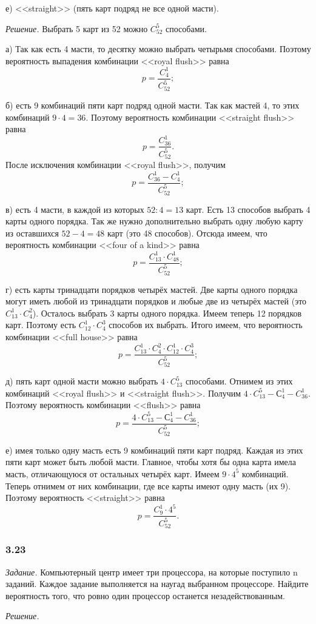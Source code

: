 \documentclass{book}
\begin{document}
е) <<straight>> (пять карт подряд не все одной масти).

\textit{Решение.} Выбрать 5 карт из 52 можно $C_{52}^5$ способами.

а) Так как есть 4 масти, то десятку можно выбрать четырьмя способами. Поэтому вероятность выпадения комбинации <<royal flush>> равна $$p=\frac{C_4^1}{C_{52}^5};$$

б) есть 9 комбинаций пяти карт подряд одной масти. Так как мастей 4, то этих комбинаций $9\cdot 4=36$. Поэтому вероятность комбинации <<straight flush>> равна $$p=\frac{C_{36}^1}{C_{52}^5}.$$ После исключения комбинации <<royal flush>>, получим $$p=\frac{C_{36}^1-C_4^1}{C_{52}^5};$$

в) есть 4 масти, в каждой из которых $52:4=13$ карт. Есть 13 способов выбрать 4 карты одного порядка. Так же нужно дополнительно выбрать одну любую карту из оставшихся $52-4=48$ карт (это 48 способов). Отсюда имеем, что вероятность комбинации <<four of a kind>> равна $$p=\frac{C_{13}^1\cdot C_{48}^1}{C_{52}^5};$$

г) есть карты тринадцати порядков четырёх мастей. Две карты одного порядка могут иметь любой из тринадцати порядков и любые две из четырёх мастей (это $C_{13}^1\cdot C_4^2$). Осталось выбрать 3 карты одного порядка. Имеем теперь 12 порядков карт. Поэтому есть $C_{12}^1\cdot C_4^3$ способов их выбрать. Итого имеем, что вероятность комбинации <<full house>> равна $$p=\frac{C_{13}^1\cdot C_4^2\cdot C_{12}^1\cdot C_4^3}{C_{52}^5};$$

д) пять карт одной масти можно выбрать $4\cdot C_{13}^5$ способами. Отнимем из этих комбинаций <<royal flush>> и <<straight flush>>. Получим $4\cdot C_{13}^5-С_4^1-C_{36}^1$. Поэтому вероятность комбинации <<flush>> равна $$p=\frac{4\cdot C_{13}^5-С_4^1-C_{36}^1}{C_{52}^5};$$

е) имея только одну масть есть 9 комбинаций пяти карт подряд. Каждая из этих пяти карт может быть любой масти. Главное, чтобы хотя бы одна карта имела масть, отличающуюся от остальных четырёх карт. Имеем $9\cdot 4^5$ комбинаций. Теперь отнимем от них комбинации, где все карты имеют одну масть (их 9). Поэтому вероятность <<straight>> равна $$p=\frac{C_9^1\cdot 4^5}{C_{52}^5}.$$

\subsubsection*{3.23}

\textit{Задание.} Компьютерный центр имеет три процессора, на которые поступило n заданий. Каждое задание выполняется на наугад выбранном процессоре. Найдите вероятность того, что ровно один процессор останется незадействованным.

\textit{Решение.}
\end{document}
